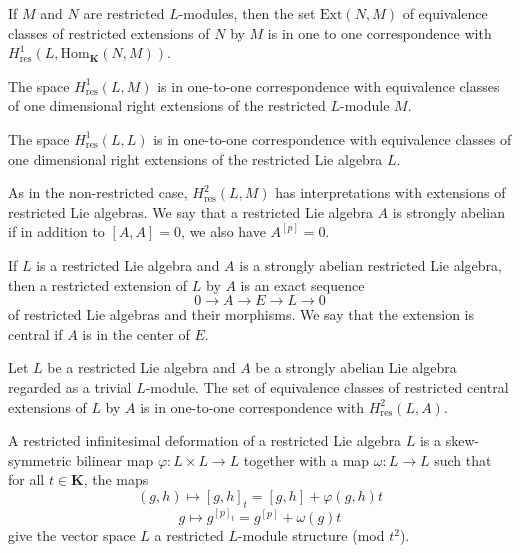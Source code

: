 \documentclass[11pt, twoside]{article}
\begin{document}
\begin{thm}\cite{E96}
    If $M$ and $N$ are restricted $L$-modules, then the set $\mathrm{Ext}(N,M)$ of equivalence classes of restricted extensions of $N$ by $M$ is in one to one correspondence with  \newline$H_\mathrm{res}^1(L,\mathrm{Hom}_\mathbf{K}(N,M))$.
\end{thm}

\begin{cor}\cite{E96}
   The space $H_\mathrm{res}^1(L,M)$ is in one-to-one correspondence with equivalence classes of one dimensional right extensions of the restricted $L$-module $M$.
\end{cor}

\begin{cor}\cite{E96}
   The space  $H_\mathrm{res}^1(L,L)$ is in one-to-one correspondence with equivalence classes of one dimensional right extensions of the restricted Lie algebra $L$.
\end{cor}

As in the non-restricted case, $H_\mathrm{res}^2(L,M) $ has interpretations with extensions of restricted Lie algebras. We say that a restricted Lie algebra $A$ is strongly abelian if in addition to $[A,A]=0$, we also have $A^{[p]}=0$.


\begin{defi}\cite{E96}
    If $L$ is a restricted Lie algebra and $A$ is a strongly abelian restricted Lie algebra, then a restricted extension of $L$ by $A$ is an exact sequence $$0\to A\to E\to L\to 0 $$ of restricted Lie algebras and their morphisms. We say that the extension is central if $A $ is in the center of $E$.
\end{defi} 

\begin{thm}\cite{E96}
Let $L$ be a restricted Lie algebra and $A$ be a strongly abelian Lie algebra regarded as a trivial $L$-module. The set of equivalence classes of restricted central extensions of $L$ by $A$ is in one-to-one correspondence with $H_\mathrm{res}^2(L,A) $. 
\end{thm}

\begin{defi}\cite{E96}
    A restricted infinitesimal deformation of a restricted Lie algebra $L$ is a skew-symmetric bilinear map $\varphi:L\times L\to L$ together with a map $\omega:L\to L$ such that for all $t\in \mathbf{K}$,  the maps $$(g,h)\mapsto [g,h]_t= [g,h]+\varphi(g,h)t $$ $$g\mapsto g^{[p]_t}= g^{[p]}+\omega(g)t $$ give the vector space $L$ a restricted $L$-module structure (mod $t^2$).
\end{defi} 
\end{document}
